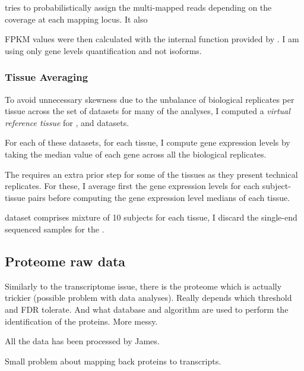  tries to probabilistically assign the multi-mapped reads
depending on the coverage at each mapping locus. It also


\gls{FPKM}
values were then calculated with the internal function provided by \irap.
I am using only gene levels quantification and not isoforms.


\subsubsection{Tissue Averaging}

To avoid unnecessary skewness due to the unbalance of biological replicates per
tissue across the set of datasets for many of the analyses, 
I computed a \emph{virtual reference tissue}
for ,  and  datasets.

For each of these datasets, for each tissue, I compute gene expression levels by
taking the median value of each gene across all the biological replicates.

The  requires an extra prior step for some of the tissues as they
present technical replicates. For these, I average first the gene expression levels
for each subject-tissue pairs before computing the gene expression level medians
of each tissue.

\NB {} dataset comprises mixture of 10 subjects for each tissue, I
discard the single-end sequenced samples for the .





\subsection{Proteome raw data}

Similarly to the transcriptome issue, there is the proteome which is actually
trickier (possible problem with  data analyses). Really depends which
threshold and \gls{FDR} tolerate. And what database and algorithm are used to perform
the identification of the proteins. More messy.

All the data has been processed by James.

Small problem about mapping back proteins to transcripts.



